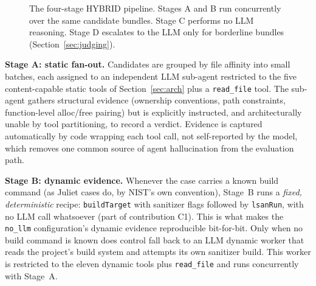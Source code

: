 \documentclass[11pt,a4paper]{article}
\begin{document}
\begin{figure}[htbp]
\centering
{}
\caption{The four-stage HYBRID pipeline. Stages A and B run concurrently
over the same candidate bundles. Stage C performs no LLM reasoning. Stage
D escalates to the LLM only for borderline bundles (Section~\ref{sec:judging}).}
\label{fig:pipeline}
\end{figure}

\textbf{Stage A: static fan-out.} Candidates are grouped by file
affinity into small batches, each assigned to an independent LLM sub-agent
restricted to the five content-capable static tools of
Section~\ref{sec:arch} plus a \texttt{read\_file} tool. The sub-agent
gathers structural evidence (ownership conventions, path constraints,
function-level alloc/free pairing) but is explicitly instructed, and
architecturally unable by tool partitioning, to record a verdict.
Evidence is captured automatically by code wrapping each tool call, not
self-reported by the model, which removes one common source of agent
hallucination from the evaluation path.

\textbf{Stage B: dynamic evidence.} Whenever the case carries a known
build command (as Juliet cases do, by NIST's own convention), Stage~B runs
a \emph{fixed, deterministic} recipe: \texttt{buildTarget} with
sanitizer flags followed by \texttt{lsanRun}, with no LLM call
whatsoever (part of contribution C1). This is what makes the \texttt{no\_llm}
configuration's dynamic evidence reproducible bit-for-bit. Only when no
build command is known does control fall back to an LLM dynamic worker
that reads the project's build system and attempts its own sanitizer
build. This worker is restricted to the eleven dynamic tools plus
\texttt{read\_file} and runs concurrently with Stage~A.
\end{document}
